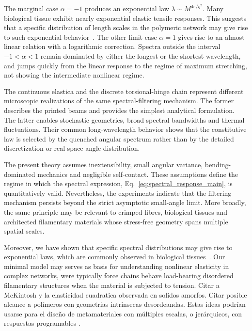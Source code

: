 \documentclass[pdflatex, twocolumn, sn-nature]{sn-jnl}
\begin{document}
The marginal case $\alpha=-1$ produces an exponential law $\lambda \sim M^{4\varepsilon/\eta^2}$. Many biological tissue exhibit nearly exponential elastic tensile responses. This suggests that a specific distribution of length scales in the polymeric network may give rise to such exponential behavior~\cite{fung1967elasticity,fung2013biomechanics}. 
The other limit case $\alpha=1$ gives rise to an almost linear relation with a logarithmic correction.
Spectra outside the interval $-1<\alpha<1$ remain dominated by either the longest or the shortest wavelength, and jumps quickly from the linear response to the regime of maximum stretching, not showing the intermediate nonlinear regime.

The continuous elastica and the discrete torsional-hinge chain represent different microscopic realizations of the same spectral-filtering mechanism. The former describes the printed beams and provides the simplest analytical formulation. The latter enables stochastic geometries, broad spectral bandwidths and thermal fluctuations. Their common long-wavelength behavior shows that the constitutive law is selected by the quenched angular spectrum rather than by the detailed discretization or real-space angle distribution.

The present theory assumes inextensibility, small angular variance, bending-dominated mechanics and negligible self-contact. These assumptions define the regime in which the spectral expression, Eq.~\eqref{eq:spectral_response_main}, is quantitatively valid. Nevertheless, the experiments indicate that the filtering mechanism persists beyond the strict asymptotic small-angle limit. More broadly, the same principle may be relevant to crimped fibres, biological tissues and architected filamentary materials whose stress-free geometry spans multiple spatial scales.

Moreover, we have shown that specific spectral distributions may give rise to exponential laws, which are commonly observed in biological tissues~\cite{fung1967elasticity}. Our minimal model may serves as basis for understanding nonlinear elasticity in complex networks, were typically force chains behave load-bearing disordered filamentary structures when the material is subjected to tension. Citar a McKintosh y la elasticidad cuadratica observada en solidos amorfos. Citar posible alcance a polímeros con geometrias intrinsecas desordeandas.
Estas ideas podrían usarse para el diseño de metamateriales con múltiples escalas, o jerárquicos, con respuestas programables \cite{zhou2025rippled}.
 
\end{document}
